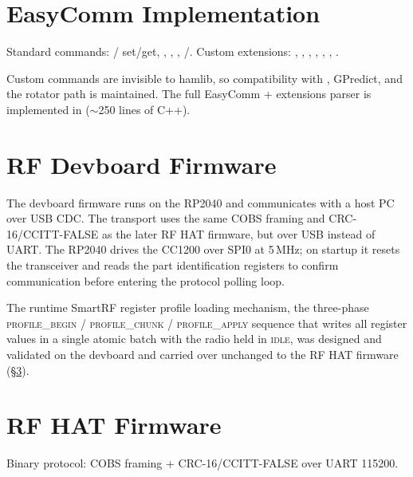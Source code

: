 \section{EasyComm Implementation}
\label{sec:easycomm}

Standard commands: / set/get, , , , /.
Custom extensions: , , , , , , .

Custom commands are invisible to hamlib, so compatibility with , GPredict, and the  rotator path is maintained. The full EasyComm + extensions parser is implemented in  ($\sim$250 lines of C++).

\section{RF Devboard Firmware}
\label{sec:devboard-firmware}

The devboard firmware runs on the RP2040 and communicates with a host PC over USB CDC. The transport uses the same COBS framing and CRC-16/CCITT-FALSE as the later RF HAT firmware, but over USB instead of UART. The RP2040 drives the CC1200 over SPI0 at 5\,MHz; on startup it resets the transceiver and reads the part identification registers to confirm communication before entering the protocol polling loop.

The runtime SmartRF register profile loading mechanism, the three-phase \textsc{profile\_begin} / \textsc{profile\_chunk} / \textsc{profile\_apply} sequence that writes all register values in a single atomic batch with the radio held in \textsc{idle}, was designed and validated on the devboard and carried over unchanged to the RF HAT firmware (\S\ref{sec:rf-hat-firmware}).

\section{RF HAT Firmware}
\label{sec:rf-hat-firmware}

Binary protocol: COBS framing + CRC-16/CCITT-FALSE over UART 115200.

